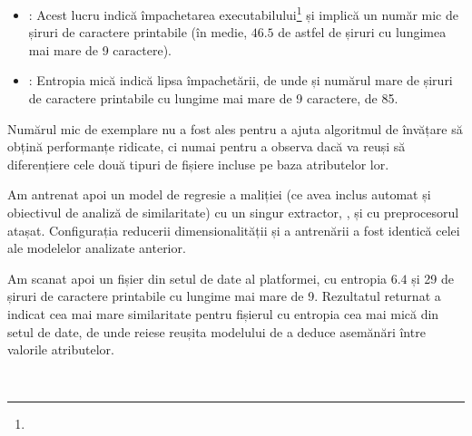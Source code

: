 \documentclass[../../main.tex]{subfiles}
\begin{document}
\begin{itemize}
    \item {}: Acest lucru indică împachetarea executabilului\footnote{} și implică un număr mic de șiruri de caractere printabile (în medie, $46.5$ de astfel de șiruri cu lungimea mai mare de 9 caractere).
    \item {}: Entropia mică indică lipsa împachetării, de unde și numărul mare de șiruri de caractere printabile cu lungime mai mare de 9 caractere, de 85.
\end{itemize}

Numărul mic de exemplare nu a fost ales pentru a ajuta algoritmul de învățare să obțină performanțe ridicate, ci numai pentru a observa dacă va reuși să diferențiere cele două tipuri de fișiere incluse pe baza atributelor lor.

Am antrenat apoi un model de regresie a maliției (ce avea inclus automat și obiectivul de analiză de similaritate) cu un singur extractor, , și cu preprocesorul  atașat. Configurația reducerii dimensionalității și a antrenării a fost identică celei ale modelelor analizate anterior.

Am scanat apoi un fișier din setul de date al platformei, cu entropia $ 6.4 $ și 29 de șiruri de caractere printabile cu lungime mai mare de 9. Rezultatul returnat a indicat cea mai mare similaritate pentru fișierul cu entropia cea mai mică din setul de date, de unde reiese reușita modelului de a deduce asemănări între valorile atributelor.

\newpage \
\end{document}

